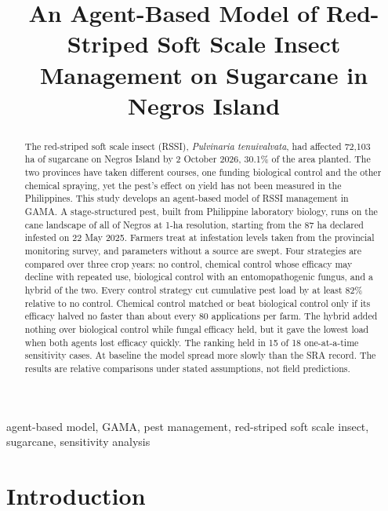 \documentclass[conference]{IEEEtran}
\begin{document}
\title{An Agent-Based Model of Red-Striped Soft Scale Insect Management on Sugarcane in Negros Island}

\author{
}

\maketitle

\begin{abstract}
The red-striped soft scale insect (RSSI), \emph{Pulvinaria tenuivalvata}, had affected 72,103 ha of sugarcane on Negros Island by 2 October 2026, 30.1\% of the area planted. The two provinces have taken different courses, one funding biological control and the other chemical spraying, yet the pest's effect on yield has not been measured in the Philippines. This study develops an agent-based model of RSSI management in GAMA. A stage-structured pest, built from Philippine laboratory biology, runs on the cane landscape of all of Negros at 1-ha resolution, starting from the 87 ha declared infested on 22 May 2025. Farmers treat at infestation levels taken from the provincial monitoring survey, and parameters without a source are swept. Four strategies are compared over three crop years: no control, chemical control whose efficacy may decline with repeated use, biological control with an entomopathogenic fungus, and a hybrid of the two. Every control strategy cut cumulative pest load by at least 82\% relative to no control. Chemical control matched or beat biological control only if its efficacy halved no faster than about every 80 applications per farm. The hybrid added nothing over biological control while fungal efficacy held, but it gave the lowest load when both agents lost efficacy quickly. The ranking held in 15 of 18 one-at-a-time sensitivity cases. At baseline the model spread more slowly than the SRA record. The results are relative comparisons under stated assumptions, not field predictions.
\end{abstract}

\begin{IEEEkeywords}
agent-based model, GAMA, pest management, red-striped soft scale insect, sugarcane, sensitivity analysis
\end{IEEEkeywords}

\section{Introduction}
\end{document}
